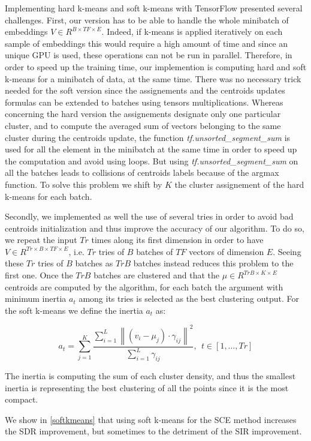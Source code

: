 \documentclass[master, tikz, final,11pt, dvipdfmx]{iscs-thesis}
\newcommand{\norm}[1]{\left\lVert#1\right\rVert}
\begin{document}
Implementing hard k-means and soft k-means with TensorFlow presented several challenges. First, our version has to be able to handle the whole minibatch of embeddings $V\in R^{B\times TF \times E}$. Indeed, if k-means is applied iteratively on each sample of embeddings this would require a high amount of time and since an unique GPU is used, these operations can not be run in parallel. Therefore, in order to speed up the training time, our implemention is computing hard and soft k-means for a minibatch of data, at the same time. There was no necessary trick needed for the soft version since the assignements and the centroids updates formulas can be extended to batches using tensors multiplications. Whereas concerning the hard version the assignements designate only one particular cluster, and to compute the averaged sum of vectors belonging to the same cluster during the centroids update, the function \textit{tf.unsorted\_segment\_sum} is used for all the element in the minibatch at the same time in order to speed up the computation and avoid using loops. But using \textit{tf.unsorted\_segment\_sum} on all the batches leads to collisions of centroids labels because of the argmax function. To solve this problem we shift by $K$ the cluster assignement of the hard k-means for each batch.

Secondly, we implemented as well the use of several tries in order to avoid bad centroids initialization and thus improve the accuracy of our algorithm. To do so, we repeat the input $Tr$ times along its first dimension in order to have $V\in R^{Tr \times B\times TF \times E}$, i.e. $Tr$ tries of $B$ batches of $TF$ vectors of dimension $E$. Seeing these $Tr$ tries of $B$ batches as $TrB$ batches instead reduces this problem to the first one. Once the $TrB$ batches are clustered and that the $\mu \in R^{TrB\times K \times E}$ centroids are computed by the algorithm, for each batch the argument with minimum inertia $a_t$ among its tries is selected as the best clustering output. For the soft k-means we define the inertia $a_t$ as:

\[
a_t = \sum_{j=1}^K \frac{\sum_{i=1}^L\norm{(v_i-\mu_j )\cdot \gamma_{ij}}^2 }{\sum_{i=1}^L\gamma_{ij}}
, ~~ t \in [1,\dots, Tr]\] 

The inertia is computing the sum of each cluster density, and thus the smallest inertia is representing the best clustering of all the points since it is the most compact.

We show in \autoref{softkmeans} that using soft k-means for the SCE method increases the SDR improvement, but sometimes to the detriment of the SIR improvement.
\end{document}
